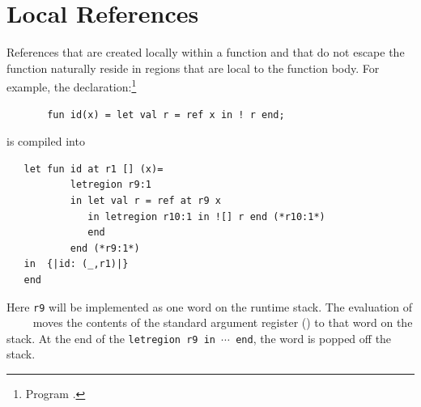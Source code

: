 \documentclass[12pt]{book}
\begin{document}
\section{Local References}
References  that are created locally within a function and that do
not escape the function naturally reside in regions that are local to
the function body.
For example, the declaration:\footnote{Program .}
\begin{verbatim}
       fun id(x) = let val r = ref x in ! r end;
\end{verbatim}
is compiled into
\begin{verbatim}
   let fun id at r1 [] (x)= 
           letregion r9:1 
           in let val r = ref at r9 x 
              in letregion r10:1 in ![] r end (*r10:1*) 
              end  
           end (*r9:1*)
   in  {|id: (_,r1)|}
   end 
\end{verbatim}
Here {\tt r9} will be implemented as one word on the runtime stack. The
evaluation of ~~~~ moves the contents of the standard
argument register () to that word on the stack. At the
end of the {\tt letregion r9 in $\cdots$ end}, the word is popped off the stack.
\end{document}
